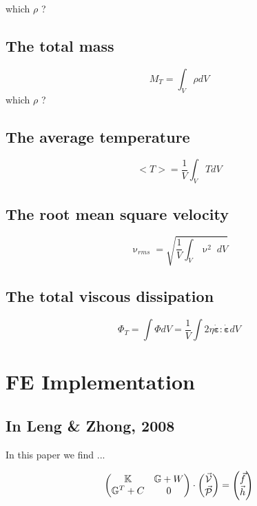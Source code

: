 \documentclass[a4paper,11pt]{article}
\newcommand{\K}{{\mathbb{K}}}
\newcommand{\G}{{\mathbb{G}}}
\begin{document}
{\color{red} which $\rho$ ?}


\subsection{The total mass}
\[
M_T=\int_V \rho dV 
\]
{\color{red} which $\rho$ ?}

\subsection{The average temperature}
\[
<T>=\frac{1}{V} \int_V T dV
\]


\subsection{The root mean square velocity}
\[
\upnu_{rms} = \sqrt{\frac{1}{V} \int_V \upnu^2 \; dV }
\]

\subsection{The total viscous dissipation}

\[
\Phi_T=\int \Phi dV =\frac{1}{V}\int 2 \eta \dot{\bm \varepsilon}:\dot{\bm \varepsilon} dV 
\]














\newpage
\section{FE Implementation}



\subsection{In Leng \& Zhong, 2008 \cite{lezh08}}

In this paper we find ...

\[
\begin{pmatrix}
\K & \G + W  \\
\G^T + C & 0
\end{pmatrix}
\cdot
\begin{pmatrix}
\vec{\cal V} \\
\vec{\cal P}
\end{pmatrix}
=
\begin{pmatrix}
\vec{f} \\
\vec{h}
\end{pmatrix}
\]
\end{document}
